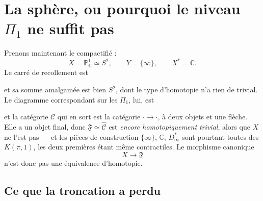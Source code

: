 \documentclass[11pt,a4paper]{article}
\begin{document}
\section*{La sphère, ou pourquoi le niveau $\Pi_{1}$ ne suffit pas}

Prenons maintenant le compactifié :
\[
  X = \mathbb{P}^{1}_{\mathbb{C}} \simeq S^{2}, \qquad
  Y = \{\infty\}, \qquad X^{*} = \mathbb{C}.
\]
Le carré de recollement est


et sa somme amalgamée est bien $S^{2}$, dont le type d'homotopie n'a rien de
trivial. Le diagramme correspondant sur les $\Pi_{1}$, lui, est


et la catégorie $\mathcal{C}$ qui en sort est la catégorie
${\cdot} \to {\cdot}$, à deux objets et une flèche. Elle a un objet final, donc
$\mathfrak{F} \simeq \widehat{\mathcal{C}}$ est \emph{encore homotopiquement
trivial}, alors que $X$ ne l'est pas — et les pièces de construction
$\{\infty\}$, $\mathbb{C}$, $D^{*}_{\infty}$ sont pourtant toutes des
$K(\pi,1)$, les deux premières étant même contractiles. Le morphisme canonique
\[
  X \longrightarrow \mathfrak{F}
\]
n'est donc pas une équivalence d'homotopie.

\subsection*{Ce que la troncation a perdu}
\end{document}
